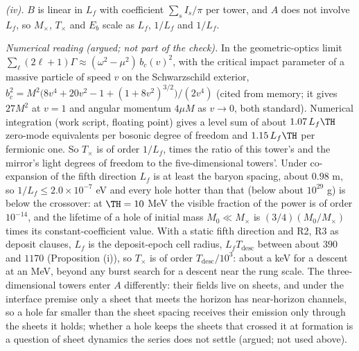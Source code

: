 \emph{(iv).} $B$ is linear in $L_{f}$ with coefficient $\sum_{s}I_{s}/\pi$ per tower, and $A$ does not involve $L_{f}$, so $M_{\times}$, $T_{\times}$ and $E_{b}$ scale as $L_{f}$, $1/L_{f}$ and $1/L_{f}$.

\emph{Numerical reading (argued; not part of the check).} In the geometric-optics limit $\sum_{\ell}(2\ell+1)\Gamma \approx (\omega^{2} - \mu^{2})\,b_{c}(v)^{2}$, with the critical impact parameter of a massive particle of speed $v$ on the Schwarzschild exterior, $b_{c}^{2} = M^{2}\bigl(8v^{4} + 20v^{2} - 1 + (1 + 8v^{2})^{3/2}\bigr)/(2v^{4})$ (cited from memory; it gives $27M^{2}$ at $v = 1$ and angular momentum $4\mu M$ as $v \to 0$, both standard). Numerical integration (work script, floating point) gives a level sum of about $1.07\,L_{f}\TH$ zero-mode equivalents per bosonic degree of freedom and $1.15\,L_{f}\TH$ per fermionic one. So $T_{\times}$ is of order $1/L_{f}$, times the ratio of this tower's and the mirror's light degrees of freedom to the five-dimensional towers'. Under co-expansion of the fifth direction $L_{f}$ is at least the baryon spacing, about $0.98$ m, so $1/L_{f} \le 2.0 \times 10^{-7}$ eV and every hole hotter than that (below about $10^{29}$ g) is below the crossover: at $\TH = 10$ MeV the visible fraction of the power is of order $10^{-14}$, and the lifetime of a hole of initial mass $M_{0} \ll M_{\times}$ is $(3/4)(M_{0}/M_{\times})$ times its constant-coefficient value. With a static fifth direction and R2, R3 as deposit clauses, $L_{f}$ is the deposit-epoch cell radius, $L_{f}T_{\mathrm{desc}}$ between about $390$ and $1170$ (Proposition (i)), so $T_{\times}$ is of order $T_{\mathrm{desc}}/10^{3}$: about a keV for a descent at an MeV, beyond any burst search for a descent near the rung scale. The three-dimensional towers enter $A$ differently: their fields live on sheets, and under the interface premise only a sheet that meets the horizon has near-horizon channels, so a hole far smaller than the sheet spacing receives their emission only through the sheets it holds; whether a hole keeps the sheets that crossed it at formation is a question of sheet dynamics the series does not settle (argued; not used above).

